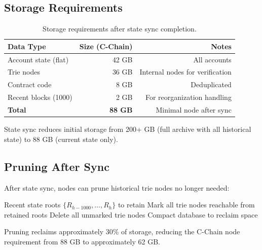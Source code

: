 \subsection{Storage Requirements}

\begin{table}[H]
\centering
\caption{Storage requirements after state sync completion.}
\label{tab:storage}
\begin{tabular}{lrr}
\toprule
\textbf{Data Type} & \textbf{Size (C-Chain)} & \textbf{Notes} \\
\midrule
Account state (flat) & 42 GB & All accounts \\
Trie nodes & 36 GB & Internal nodes for verification \\
Contract code & 8 GB & Deduplicated \\
Recent blocks (1000) & 2 GB & For reorganization handling \\
\midrule
\textbf{Total} & \textbf{88 GB} & Minimal node after sync \\
\bottomrule
\end{tabular}
\end{table}

State sync reduces initial storage from 200+ GB (full archive with all historical state) to 88 GB (current state only).

\subsection{Pruning After Sync}

After state sync, nodes can prune historical trie nodes no longer needed:

\begin{algorithm}[H]
\caption{Post-Sync State Pruning}
\label{alg:prune}
\begin{algorithmic}[1]
\Require Recent state roots $\{R_{h-1000}, \ldots, R_h\}$ to retain
\State Mark all trie nodes reachable from retained roots
\State Delete all unmarked trie nodes
\State Compact database to reclaim space
\end{algorithmic}
\end{algorithm}

Pruning reclaims approximately 30\% of storage, reducing the C-Chain node requirement from 88 GB to approximately 62 GB.

